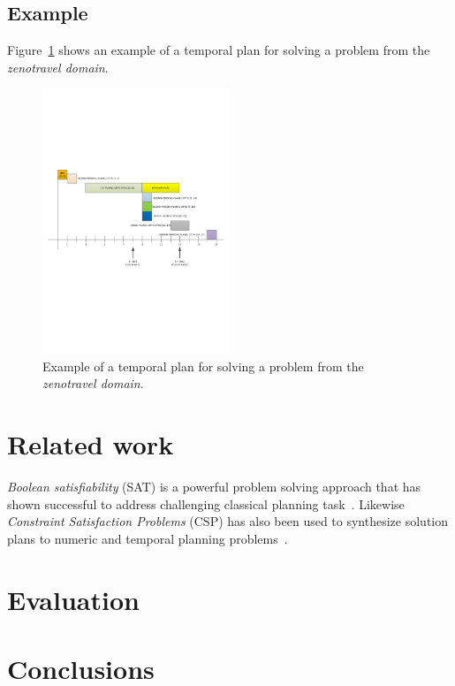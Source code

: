 \documentclass[letterpaper]{article} %
\begin{document}
\subsection{Example}
Figure~\ref{fig:plan} shows an example of a temporal plan for solving a problem from the {\em zenotravel domain}.

\begin{figure}[hbt!]
        \includegraphics[width=0.5\textwidth]{plan.pdf}
	\caption{Example of a temporal plan for solving a problem from the {\em zenotravel domain}.}
	\label{fig:plan}
\end{figure}


\section{Related work}
\label{sec:related}
{\em Boolean satisfiability} (SAT) is a powerful problem solving approach that has shown successful to address challenging classical planning task~\cite{kautz1999unifying,rintanen2009planning,rintanen2012planning}. Likewise {\em Constraint Satisfaction Problems} (CSP) has also been used to synthesize solution plans to numeric and temporal planning problems~\cite{do2001planning,lopez2003generalizing,vidal2006branching,garrido2009constraint}. 


\section{Evaluation}
\label{sec:evaluation}

\section{Conclusions}
\label{sec:conclusions}





\end{document}
